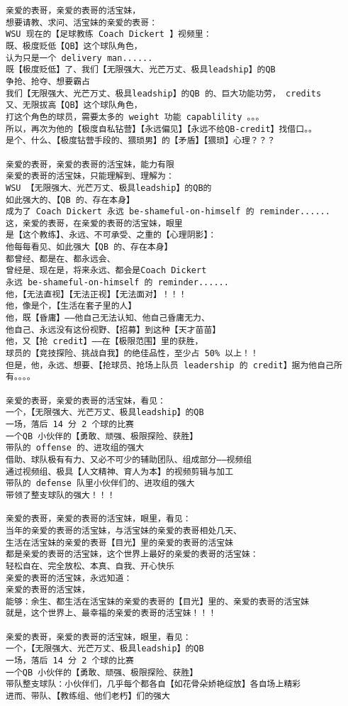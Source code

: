 \documentclass[9pt, b5paper]{article}
\begin{document}
\begin{verbatim}
亲爱的表哥，亲爱的表哥的活宝妹，
想要请教、求问、活宝妹的亲爱的表哥：
WSU 现在的【足球教练 Coach Dickert 】视频里：
既、极度贬低【QB】这个球队角色，
认为只是一个 delivery man...... 
既【极度贬低】了、我们【无限强大、光芒万丈、极具leadship】的QB
争抢、抢夺、想要霸占
我们【无限强大、光芒万丈、极具leadship】的QB 的、巨大功能功劳， credits 
又、无限拔高【QB】这个球队角色，
打这个角色的球员，需要太多的 weight 功能 capablility 。。。
所以，再次为他的【极度自私钻营】【永远偏见】【永远不给QB-credit】找借口。。
是个、什么、【极度钻营手段的、猥琐男】的【矛盾】【猥琐】心理？？？

亲爱的表哥，亲爱的表哥的活宝妹，能力有限
亲爱的表哥的活宝妹，只能理解到、理解为：
WSU 【无限强大、光芒万丈、极具leadship】的QB的
如此强大的、【QB 的、存在本身】
成为了 Coach Dickert 永远 be-shameful-on-himself 的 reminder......
这，亲爱的表哥，在亲爱的表哥的活宝妹，眼里
是【这个教练】、永远、不可承受、之重的【心理阴影】：
他每每看见、如此强大【QB 的、存在本身】
都曾经、都是在、都永远会、
曾经是、现在是，将来永远、都会是Coach Dickert
永远 be-shameful-on-himself 的 reminder......
他，【无法直视】【无法正视】【无法面对】！！！
他，像是个，【生活在套子里的人】
他，既【昏庸】——他自己无法认知、他自己昏庸无力、
他自己、永远没有这份视野、【招募】到这种【天才苗苗】
他，又【抢 credit】——在【极限范围】里的获胜，
球员的【竞技探险、挑战自我】的绝佳品性，至少占 50% 以上！！
但是，他，永远、想要、【抢球员、抢场上队员 leadership 的 credit】据为他自己所有。。。。

亲爱的表哥，亲爱的表哥的活宝妹，看见：
一个，【无限强大、光芒万丈、极具leadship】的QB
一场，落后 14 分 2 个球的比赛
一个QB 小伙伴的【勇敢、顽强、极限探险、获胜】
带队的 offense 的、进攻组的强大
借助、球队极有有力、又必不可少的辅助团队、组成部分——视频组
通过视频组、极具【人文精神、育人为本】的视频剪辑与加工
带队的 defense 队里小伙伴们的、进攻组的强大
带领了整支球队的强大！！！

亲爱的表哥，亲爱的表哥的活宝妹，眼里，看见：
当年的亲爱的表哥的活宝妹，与活宝妹的亲爱的表哥相处几天、
生活在活宝妹的亲爱的表哥【目光】里的亲爱的表哥的活宝妹
都是亲爱的表哥的活宝妹，这个世界上最好的亲爱的表哥的活宝妹：
轻松自在、完全放松、本真、自我、开心快乐
亲爱的表哥的活宝妹，永远知道：
亲爱的表哥的活宝妹，
能够：余生、都生活在活宝妹的亲爱的表哥的【目光】里的、亲爱的表哥的活宝妹
就是，这个世界上、最幸福的亲爱的表哥的活宝妹！！！

亲爱的表哥，亲爱的表哥的活宝妹，眼里，看见：
一个，【无限强大、光芒万丈、极具leadship】的QB
一场，落后 14 分 2 个球的比赛
一个QB 小伙伴的【勇敢、顽强、极限探险、获胜】
带队整支球队：小伙伴们，几乎每个都各自【如花骨朵娇艳绽放】各自场上精彩
进而、带队、【教练组、他们老朽】们的强大


\end{verbatim}
\end{document}

